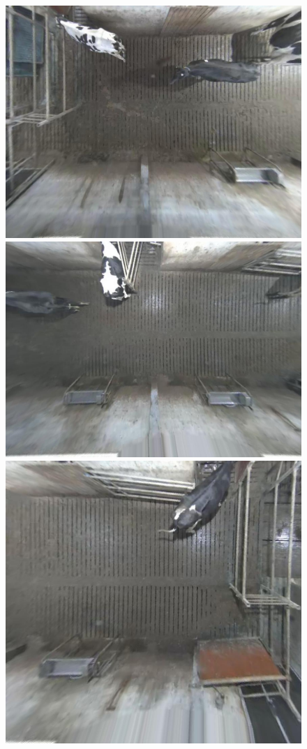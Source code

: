 \documentclass{cta-author}
\begin{document}
\begin{figure}[b]
\begin{center}
  \includegraphics[height=0.15\textheight]{left_single.jpg}
  \includegraphics[height=0.15\textheight]{mid_single.jpg}
  \includegraphics[height=0.15\textheight]{right_single.jpg}

\end{center}
\end{figure}
\end{document}
